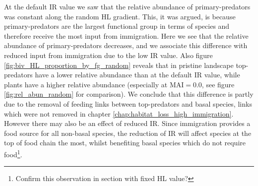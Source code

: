 At the default IR value we saw that the relative abundance of primary-predators was constant along the random HL gradient. This, it was argued, is because primary-predators are the largest functional group in terms of species and therefore receive the most input from immigration. Here we see that the relative abundance of primary-predators decreases, and we associate this difference with reduced input from immigration due to the low IR value. Also figure \ref{fig:biv_HL_proportion_by_fg_random} reveals that in pristine landscape top-predators have a lower relative abundance than at the default IR value, while plants have a higher relative abundance (especially at MAI$=0.0$, see figure \ref{fig:rel_abun_random} for comparison). We conclude that this difference is partly due to the removal of feeding links between top-predators and basal species, links which were not removed in chapter \ref{chap:habitat_loss_high_immigration}. However there may also be an effect of reduced IR. Since immigration provides a food source for all non-basal species, the reduction of IR will affect species at the top of food chain the most, whilst benefiting basal species which do not require food\footnote{Confirm this observation in section with fixed HL value?}.
%

